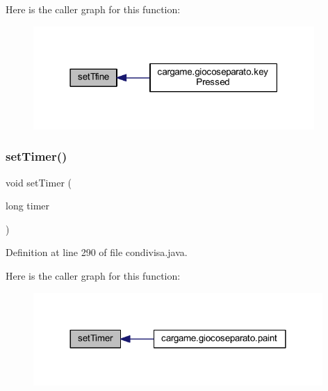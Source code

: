 Here is the caller graph for this function\+:
\nopagebreak
\begin{figure}[H]
\begin{center}
\leavevmode
\includegraphics[width=303pt]{classcargame_1_1condivisa_a4a84cdccb50ce3a07a022dbca8b99fe3_icgraph}
\end{center}
\end{figure}
\mbox{\label{classcargame_1_1condivisa_ac28059108d8bb51d1f8e47bd4591c24b}} 
\subsubsection{\texorpdfstring{set\+Timer()}{setTimer()}}
{\footnotesize\ttfamily void set\+Timer (\begin{DoxyParamCaption}\item[{long}]{timer }\end{DoxyParamCaption})}



Definition at line 290 of file condivisa.\+java.

Here is the caller graph for this function\+:
\nopagebreak
\begin{figure}[H]
\begin{center}
\leavevmode
\includegraphics[width=312pt]{classcargame_1_1condivisa_ac28059108d8bb51d1f8e47bd4591c24b_icgraph}
\end{center}
\end{figure}
\mbox{\label{classcargame_1_1condivisa_a062a34ec0119afcbcc5f60b70c27cef3}} 
